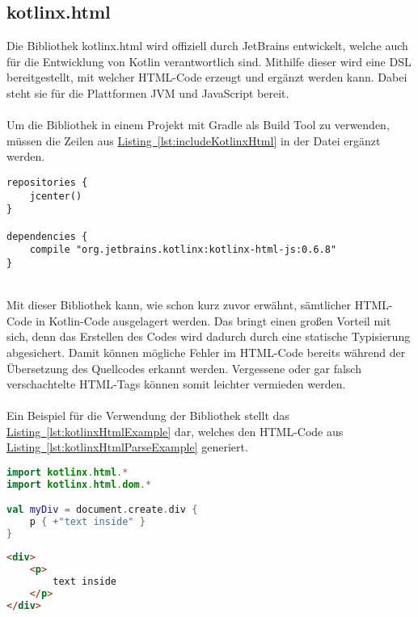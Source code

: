 \subsection{kotlinx.html}\label{sec:kotlinxHtml}
Die Bibliothek kotlinx.html \cite{kotlinxHtml} wird offiziell durch JetBrains entwickelt, welche auch für die Entwicklung von Kotlin verantwortlich sind. Mithilfe dieser wird eine \gls{DSL} bereitgestellt, mit welcher \gls{HTML}-Code erzeugt und ergänzt werden kann. Dabei steht sie für die Plattformen \gls{JVM} und JavaScript bereit.\\
\\
Um die Bibliothek in einem Projekt mit Gradle als Build Tool zu verwenden, müssen die Zeilen aus \hyperref[lst:includeKotlinxHtml]{Listing~\ref{lst:includeKotlinxHtml}} in der Datei  ergänzt werden.
\\
\begin{lstlisting}[style=lstStyleFramed, language=Gradle, caption={Einbindung der Bibliothek kotlinx.html mithilfe von Gradle}, label=lst:includeKotlinxHtml, float]
repositories {
	jcenter()
}

dependencies {
	compile "org.jetbrains.kotlinx:kotlinx-html-js:0.6.8"
}
\end{lstlisting}
\\
Mit dieser Bibliothek kann, wie schon kurz zuvor erwähnt, sämtlicher \gls{HTML}-Code in Kotlin-Code ausgelagert werden. Das bringt einen großen Vorteil mit sich, denn das Erstellen des Codes wird dadurch durch eine statische Typisierung abgesichert. Damit können mögliche Fehler im \gls{HTML}-Code bereits während der Übersetzung des Quellcodes erkannt werden. Vergessene oder gar falsch verschachtelte \gls{HTML}-Tags können somit leichter vermieden werden.\\
\\
Ein Beispiel für die Verwendung der Bibliothek stellt das \hyperref[lst:kotlinxHtmlExample]{Listing~\ref{lst:kotlinxHtmlExample}} dar, welches den \gls{HTML}-Code aus \hyperref[lst:kotlinxHtmlParseExample]{Listing~\ref{lst:kotlinxHtmlParseExample}} generiert.
\\
\begin{lstlisting}[style=lstStyleFramed, language=Kotlin, caption={Beispiel: Verwendung der Bibliothek kotlinx.html \cite{kotlinxHtmlExample}}, label=lst:kotlinxHtmlExample, float]
import kotlinx.html.*
import kotlinx.html.dom.*

val myDiv = document.create.div {
	p { +"text inside" }
}
\end{lstlisting}
\begin{lstlisting}[style=lstStyleFramed, language=html, caption={Beispiel: Verwendung der Bibliothek kotlinx.html (Ergebnis)}, label=lst:kotlinxHtmlParseExample, float]
<div>
	<p>
		text inside
	</p>
</div>
\end{lstlisting}

